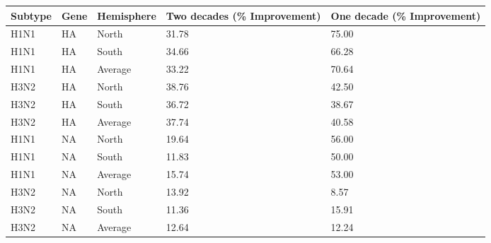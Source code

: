 \begin{tabular}{C{.5in}|C{.5in}|C{.75in}|C{1.75in}|C{1.75in}}\hline
Subtype & Gene & Hemisphere & Two  decades  (\%  Improvement) & One  decade  (\%  Improvement) \\\hline
H1N1&HA& North &31.78&75.00\\\hline
H1N1&HA& South &34.66&66.28\\\hline
{}H1N1&HA&Average&33.22&70.64\\\hline
H3N2&HA& North &38.76&42.50\\\hline
H3N2&HA& South &36.72&38.67\\\hline
{}H3N2&HA&Average&37.74&40.58\\\hline
H1N1&NA& North &19.64&56.00\\\hline
H1N1&NA& South &11.83&50.00\\\hline
{}H1N1&NA&Average&15.74&53.00\\\hline
H3N2&NA& North &13.92&8.57\\\hline
H3N2&NA& South &11.36&15.91\\\hline
{}H3N2&NA&Average&12.64&12.24\\\hline
\end{tabular}
